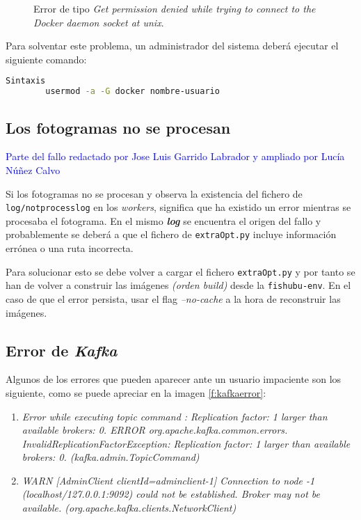 \begin{figure}[H]
 \centering
{}
 \caption{Error de tipo \textit{Get permission denied while trying to connect to the Docker daemon socket at unix}.}
 \label{f:permissionDe}
\end{figure}

Para solventar este problema, un administrador del sistema deberá ejecutar el siguiente comando:
\begin{lstlisting}[language=Bash]
 Sintaxis
	    usermod -a -G docker nombre-usuario
\end{lstlisting}

\subsection{Los fotogramas no se procesan}
\textcolor{blue}{Parte del fallo redactado por Jose Luis Garrido Labrador y ampliado por Lucía Núñez Calvo}

Si los fotogramas no se procesan y observa la existencia del fichero de \texttt{log/notprocesslog} en los \textit{workers}, significa que ha existido un error mientras se procesaba el fotograma. En el mismo \textit{\textbf{log}} se encuentra el origen del fallo y probablemente se deberá a que el fichero de \texttt{extraOpt.py} incluye información errónea o una ruta incorrecta.

Para solucionar esto se debe volver a cargar el fichero \texttt{extraOpt.py} y por tanto se han de volver a construir  las imágenes \emph{(orden build)} desde la \texttt{fishubu-env}. En el caso de que el error persista, usar el flag \emph{--no-cache} a
la hora de reconstruir las imágenes.

\subsection{Error de \textit{Kafka}}

Algunos de los errores que pueden aparecer ante un usuario impaciente son los siguiente, como se puede apreciar en la imagen \ref{f:kafkaerror}: 
\begin{enumerate}
    \item \textit{Error while executing topic command : Replication factor: 1 larger than available brokers: 0.
ERROR org.apache.kafka.common.errors.
InvalidReplicationFactorException: Replication factor: 1 larger than available brokers: 0. (kafka.admin.TopicCommand)}
    \item \textit{WARN [AdminClient clientId=adminclient-1] Connection to node -1 (localhost/127.0.0.1:9092) could not be established. Broker may not be available. (org.apache.kafka.clients.NetworkClient)}
\end{enumerate}

